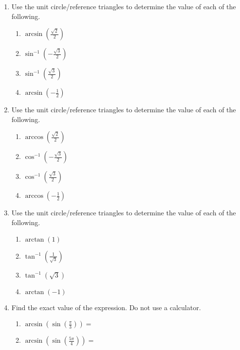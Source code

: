 \begin{enumerate}

\item Use the unit circle/reference triangles to determine the value of each of the following.
\begin{enumerate}
\item $\arcsin \left( \frac{\sqrt{2}}{2}\right)$
  \vfill
\item $\sin^{-1} \left( -\frac{\sqrt{3}}{2}\right)$
  \vfill
\item $\sin^{-1} \left( \frac{\sqrt{3}}{2}\right)$
  \vfill
\item $\arcsin \left( -\frac{1}{2}\right)$
  \vfill
\end{enumerate}


\item Use the unit circle/reference triangles to determine the value of each of the following.
\begin{enumerate}
\item $\arccos \left( \frac{\sqrt{2}}{2}\right)$
  \vfill
\item $\cos^{-1} \left( -\frac{\sqrt{3}}{2}\right)$
  \vfill
\item $\cos^{-1} \left( \frac{\sqrt{3}}{2}\right)$
  \vfill
\item $\arccos \left( -\frac{1}{2}\right)$
  \vfill
\end{enumerate}

\clearpage

\item Use the unit circle/reference triangles to determine the value of each of the following.
\begin{enumerate}
\item $\arctan \left( 1 \right)$
  \vfill
\item $\tan^{-1} \left( \frac{1}{\sqrt{3}}\right)$
  \vfill
\item $\tan^{-1} \left(\sqrt{3}\right)$
  \vfill
\item $\arctan \left( -1 \right)$
  \vfill
\end{enumerate}


\item Find the exact value of the expression.  Do not use a calculator.

\begin{enumerate}

\item $\arcsin \left(\sin\left(\frac{\pi}{3}\right)\right)=$
\vfill

\item $\arcsin \left(\sin\left(\frac{5\pi}{4}\right)\right)=$
\vfill


\end{enumerate}
\end{enumerate}
